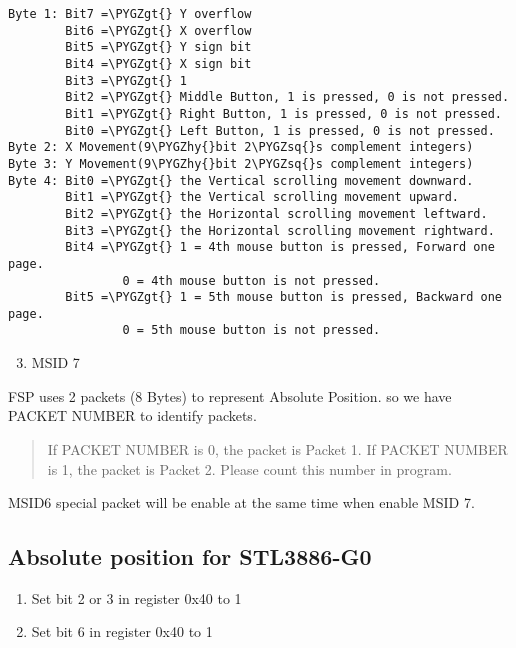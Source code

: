 \documentclass[a4paper,8pt,english]{sphinxmanual}
\def\PYGZgt{\char`\>}
\def\PYGZhy{\char`\-}
\def\PYGZsq{\char`\'}
\renewcommand\PYGZsq{\textquotesingle}
\begin{document}
\begin{Verbatim}[commandchars=\\\{\}]
Byte 1: Bit7 =\PYGZgt{} Y overflow
        Bit6 =\PYGZgt{} X overflow
        Bit5 =\PYGZgt{} Y sign bit
        Bit4 =\PYGZgt{} X sign bit
        Bit3 =\PYGZgt{} 1
        Bit2 =\PYGZgt{} Middle Button, 1 is pressed, 0 is not pressed.
        Bit1 =\PYGZgt{} Right Button, 1 is pressed, 0 is not pressed.
        Bit0 =\PYGZgt{} Left Button, 1 is pressed, 0 is not pressed.
Byte 2: X Movement(9\PYGZhy{}bit 2\PYGZsq{}s complement integers)
Byte 3: Y Movement(9\PYGZhy{}bit 2\PYGZsq{}s complement integers)
Byte 4: Bit0 =\PYGZgt{} the Vertical scrolling movement downward.
        Bit1 =\PYGZgt{} the Vertical scrolling movement upward.
        Bit2 =\PYGZgt{} the Horizontal scrolling movement leftward.
        Bit3 =\PYGZgt{} the Horizontal scrolling movement rightward.
        Bit4 =\PYGZgt{} 1 = 4th mouse button is pressed, Forward one page.
                0 = 4th mouse button is not pressed.
        Bit5 =\PYGZgt{} 1 = 5th mouse button is pressed, Backward one page.
                0 = 5th mouse button is not pressed.
\end{Verbatim}
\begin{enumerate}
\setcounter{enumi}{2}
\item {} 
MSID 7

\end{enumerate}

FSP uses 2 packets (8 Bytes) to represent Absolute Position.
so we have PACKET NUMBER to identify packets.
\begin{quote}

If PACKET NUMBER is 0, the packet is Packet 1.
If PACKET NUMBER is 1, the packet is Packet 2.
Please count this number in program.
\end{quote}

MSID6 special packet will be enable at the same time when enable MSID 7.


\subsection{Absolute position for STL3886-G0}
\label{input/devices/sentelic:absolute-position-for-stl3886-g0}\begin{enumerate}
\item {} 
Set bit 2 or 3 in register 0x40 to 1

\item {} 
Set bit 6 in register 0x40 to 1

\end{enumerate}
\end{document}
